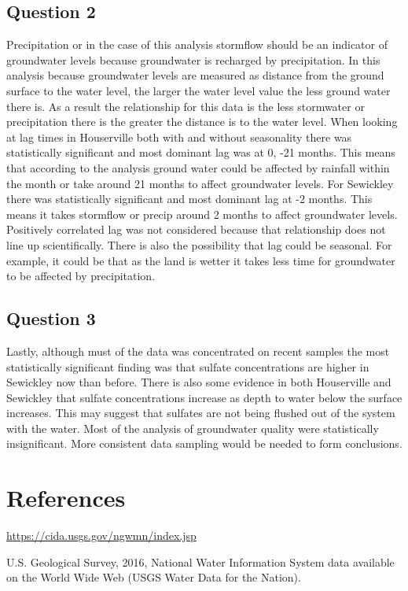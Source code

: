 \documentclass[
  12pt,
]{article}
\begin{document}
\hypertarget{question-2}{%
\subsection{Question 2}\label{question-2}}

Precipitation or in the case of this analysis stormflow should be an
indicator of groundwater levels because groundwater is recharged by
precipitation. In this analysis because groundwater levels are measured
as distance from the ground surface to the water level, the larger the
water level value the less ground water there is. As a result the
relationship for this data is the less stormwater or precipitation there
is the greater the distance is to the water level. When looking at lag
times in Houserville both with and without seasonality there was
statistically significant and most dominant lag was at 0, -21 months.
This means that according to the analysis ground water could be affected
by rainfall within the month or take around 21 months to affect
groundwater levels. For Sewickley there was statistically significant
and most dominant lag at -2 months. This means it takes stormflow or
precip around 2 months to affect groundwater levels. Positively
correlated lag was not considered because that relationship does not
line up scientifically. There is also the possibility that lag could be
seasonal. For example, it could be that as the land is wetter it takes
less time for groundwater to be affected by precipitation.

\hypertarget{question-3}{%
\subsection{Question 3}\label{question-3}}

Lastly, although must of the data was concentrated on recent samples the
most statistically significant finding was that sulfate concentrations
are higher in Sewickley now than before. There is also some evidence in
both Houserville and Sewickley that sulfate concentrations increase as
depth to water below the surface increases. This may suggest that
sulfates are not being flushed out of the system with the water. Most of
the analysis of groundwater quality were statistically insignificant.
More consistent data sampling would be needed to form conclusions.

\newpage

\hypertarget{references}{%
\section{References}\label{references}}

\url{https://cida.usgs.gov/ngwmn/index.jsp}

U.S. Geological Survey, 2016, National Water Information System data
available on the World Wide Web (USGS Water Data for the Nation).
\end{document}
